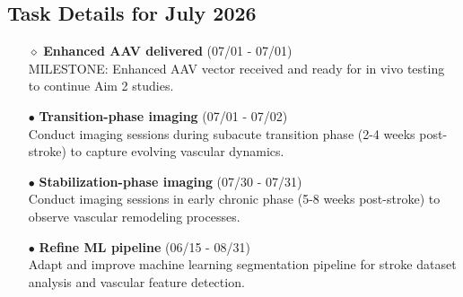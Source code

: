 \documentclass[landscape,a4paper]{article}
\begin{document}
\vspace{0.5cm}
\subsection{Task Details for July 2026}
\begin{itemize}[leftmargin=1cm]
    \item[\textcolor{other}{$\diamond$}] \textbf{Enhanced AAV delivered} (07/01 - 07/01)\\ MILESTONE: Enhanced AAV vector received and ready for in vivo testing to continue Aim 2 studies.
    \item[\textcolor{other}{$\bullet$}] \textbf{Transition-phase imaging} (07/01 - 07/02)\\ Conduct imaging sessions during subacute transition phase (2-4 weeks post-stroke) to capture evolving vascular dynamics.
    \item[\textcolor{other}{$\bullet$}] \textbf{Stabilization-phase imaging} (07/30 - 07/31)\\ Conduct imaging sessions in early chronic phase (5-8 weeks post-stroke) to observe vascular remodeling processes.
    \item[\textcolor{other}{$\bullet$}] \textbf{Refine ML pipeline} (06/15 - 08/31)\\ Adapt and improve machine learning segmentation pipeline for stroke dataset analysis and vascular feature detection.
\end{itemize}
\end{document}
